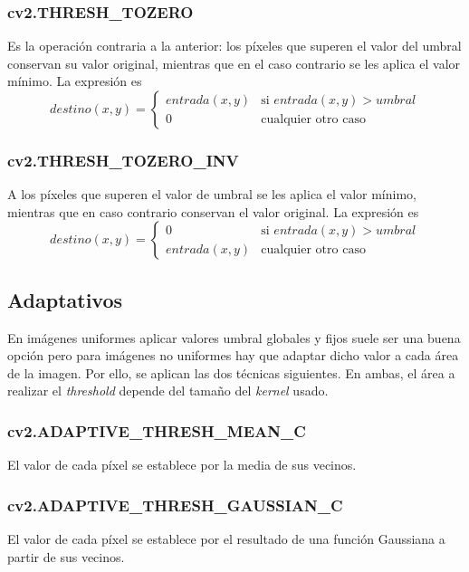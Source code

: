 \subsubsection{cv2.THRESH\_TOZERO}
Es la operación contraria a la anterior: los píxeles que superen el valor del 
umbral conservan su valor original, mientras que en el caso contrario se les 
aplica el valor mínimo. La expresión es
\begin{equation*}
  destino(x, y) =
  \begin{cases}
    entrada(x, y) & \text{si } entrada(x, y) > umbral \\
    0 & \text{cualquier otro caso}
  \end{cases}
\end{equation*}
\subsubsection{cv2.THRESH\_TOZERO\_INV}
A los píxeles que superen el valor de umbral se les aplica el
valor mínimo, mientras que en caso contrario conservan el valor original. La
expresión es
\begin{equation*}
  destino(x, y) =
  \begin{cases}
    0  & \text{si } entrada(x, y) > umbral \\
    entrada(x, y) & \text{cualquier otro caso}
  \end{cases}
\end{equation*}
\subsection{Adaptativos}
En imágenes uniformes aplicar valores umbral globales y fijos suele
ser una buena opción pero para imágenes no uniformes hay que adaptar
dicho valor a cada área de la imagen. Por ello, se aplican las dos
técnicas siguientes. En ambas, el área a realizar el \emph{threshold}
depende del tamaño del \emph{kernel} usado.

\subsubsection{cv2.ADAPTIVE\_THRESH\_MEAN\_C}
El valor de cada píxel se establece por la media de sus vecinos.

\subsubsection{cv2.ADAPTIVE\_THRESH\_GAUSSIAN\_C}
El valor de cada píxel se establece por el resultado de una función
Gaussiana a partir de sus vecinos.


